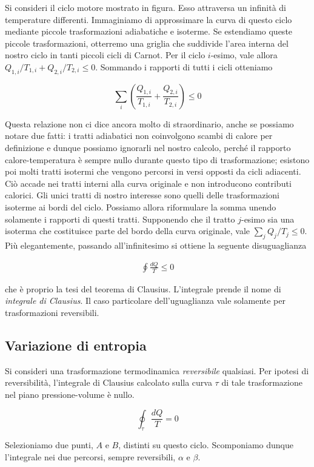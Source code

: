 Si consideri il ciclo motore mostrato in figura. Esso attraversa
un infinità di temperature differenti. Immaginiamo di approssimare
la curva di questo ciclo mediante piccole trasformazioni adiabatiche
e isoterme. Se estendiamo queste piccole trasformazioni, otterremo
una griglia che suddivide l'area interna del nostro ciclo in tanti
piccoli cicli di Carnot. Per il ciclo $i$-esimo, vale allora
$Q_{1,i}/T_{1,i} + Q_{2,i}/T_{2,i} \leq 0$. Sommando i rapporti di
tutti i cicli otteniamo

\[ \sum_i \left(\frac{Q_{1,i}}{T_{1,i}} + \frac{Q_{2,i}}{T_{2,i}}\right) \leq 0 \]

\noindent Questa relazione non ci dice ancora molto di straordinario,
anche se possiamo notare due fatti: i tratti adiabatici non coinvolgono
scambi di calore per definizione e dunque possiamo ignorarli nel
nostro calcolo, perché il rapporto calore-temperatura è sempre nullo
durante questo tipo di trasformazione; esistono poi molti tratti
isotermi che vengono percorsi in versi opposti da cicli adiacenti.
Ciò accade nei tratti interni alla curva originale e non introducono
contributi calorici. Gli unici tratti di nostro interesse sono
quelli delle trasformazioni isoterme ai bordi del ciclo. Possiamo
allora riformulare la somma unendo solamente i rapporti di questi
tratti. Supponendo che il tratto $j$-esimo sia una isoterma che
costituisce parte del bordo della curva originale, vale
$\sum_j Q_j/T_j \leq 0$. Più elegantemente, passando all'infinitesimo
si ottiene la seguente disuguaglianza

\begin{align}
    \oint \frac{dQ}{T} \leq 0
\end{align}

\noindent che è proprio la tesi del teorema di Clausius. L'integrale
prende il nome di \textit{integrale di Clausius}. Il caso particolare
dell'uguaglianza vale solamente per trasformazioni reversibili.

\subsection{Variazione di entropia}
Si consideri una trasformazione termodinamica \textit{reversibile} qualsiasi.
Per ipotesi di reversibilità, l'integrale di Clausius calcolato sulla curva $\tau$
di tale trasformazione nel piano pressione-volume è nullo.

\[ \oint_\tau \frac{dQ}{T} = 0 \]

\noindent Selezioniamo due punti, $A$ e $B$, distinti su questo ciclo. Scomponiamo
dunque l'integrale nei due percorsi, sempre reversibili, $\alpha$ e $\beta$.

